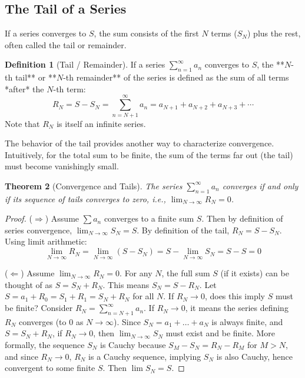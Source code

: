 \documentclass[11pt, letterpaper]{article}
\theoremstyle{plain} %
\newtheorem{theorem}{Theorem}[section] %
\theoremstyle{definition} %
\newtheorem{definition}[theorem]{Definition} %
\theoremstyle{remark} %
\begin{document}
\subsection{The Tail of a Series}

If a series converges to $S$, the sum consists of the first $N$ terms ($S_N$) plus the rest, often called the tail or remainder.

\begin{definition}[Tail / Remainder]
If a series $\sum_{n=1}^{\infty} a_n$ converges to $S$, the **$N$-th tail** or **$N$-th remainder** of the series is defined as the sum of all terms *after* the $N$-th term:
\[ R_N = S - S_N = \sum_{n=N+1}^{\infty} a_n = a_{N+1} + a_{N+2} + a_{N+3} + \dotsb \]
Note that $R_N$ is itself an infinite series.
\end{definition}

The behavior of the tail provides another way to characterize convergence. Intuitively, for the total sum to be finite, the sum of the terms far out (the tail) must become vanishingly small.

\begin{theorem}[Convergence and Tails]
The series $\sum_{n=1}^{\infty} a_n$ converges if and only if its sequence of tails converges to zero, i.e., $\lim_{N \to \infty} R_N = 0$.
\end{theorem}

\begin{proof}
($\Rightarrow$) Assume $\sum a_n$ converges to a finite sum $S$. Then by definition of series convergence, $\lim_{N \to \infty} S_N = S$. By definition of the tail, $R_N = S - S_N$. Using limit arithmetic:
\[ \lim_{N \to \infty} R_N = \lim_{N \to \infty} (S - S_N) = S - \lim_{N \to \infty} S_N = S - S = 0 \]

($\Leftarrow$) Assume $\lim_{N \to \infty} R_N = 0$. For any $N$, the full sum $S$ (if it exists) can be thought of as $S = S_N + R_N$. This means $S_N = S - R_N$. Let $S = a_1 + R_0 = S_1 + R_1 = S_N + R_N$ for all $N$. If $R_N \to 0$, does this imply $S$ must be finite?
Consider $R_N = \sum_{n=N+1}^\infty a_n$. If $R_N \to 0$, it means the series defining $R_N$ converges (to 0 as $N \to \infty$). Since $S_N = a_1 + \dots + a_N$ is always finite, and $S = S_N + R_N$, if $R_N \to 0$, then $\lim_{N \to \infty} S_N$ must exist and be finite. More formally, the sequence $S_N$ is Cauchy because $S_M - S_N = R_N - R_M$ for $M>N$, and since $R_N \to 0$, $R_N$ is a Cauchy sequence, implying $S_N$ is also Cauchy, hence convergent to some finite $S$. Then $\lim S_N = S$.
\end{proof}
\end{document}
